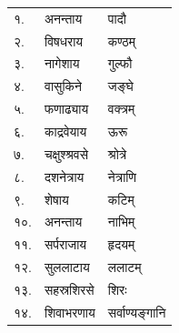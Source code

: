 \begin{longtable}{ll@{~नमः — }l@{~पूजयामि}}
    १. & अनन्ताय & पादौ\\
    २. & विषधराय & कण्ठम्\\
    ३. & नागेशाय & गुल्फौ\\
    ४. & वासुकिने & जङ्घे\\
    ५. & फणाढ्याय & वक्त्रम्\\
    ६. & काद्रवेयाय & ऊरू\\
    ७. & चक्षुश्श्रवसे & श्रोत्रे\\
    ८. & दशनेत्राय & नेत्राणि\\
    ९. & शेषाय & कटिम्\\
    १०. & अनन्ताय & नाभिम्\\
    ११. & सर्पराजाय & हृदयम्\\
    १२. & सुललाटाय & ललाटम्\\
    १३. & सहस्रशिरसे & शिरः\\
    १४. & शिवाभरणाय & सर्वाण्यङ्गानि\\
\end{longtable}

